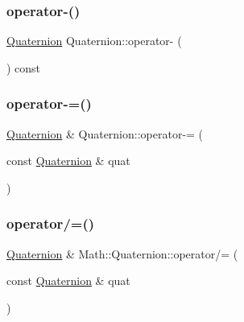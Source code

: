 \mbox{\label{struct_math_1_1_quaternion_aff7a0a5aeea4a3fe860cb90a649e389c}} 
\subsubsection{\texorpdfstring{operator-\/()}{operator-()}}
{\footnotesize\ttfamily \mbox{\hyperlink{struct_math_1_1_quaternion}{Quaternion}} Quaternion\+::operator-\/ (\begin{DoxyParamCaption}{ }\end{DoxyParamCaption}) const}

\mbox{\label{struct_math_1_1_quaternion_af1884a86f9d7d61197a2fb8a704bc58f}} 
\subsubsection{\texorpdfstring{operator-\/=()}{operator-=()}}
{\footnotesize\ttfamily \mbox{\hyperlink{struct_math_1_1_quaternion}{Quaternion}} \& Quaternion\+::operator-\/= (\begin{DoxyParamCaption}\item[{const \mbox{\hyperlink{struct_math_1_1_quaternion}{Quaternion}} \&}]{quat }\end{DoxyParamCaption})}

\mbox{\label{struct_math_1_1_quaternion_a04a144dcc8a5401104fd88248b13e84a}} 
\subsubsection{\texorpdfstring{operator/=()}{operator/=()}\hspace{0.1cm}{\footnotesize\ttfamily [1/2]}}
{\footnotesize\ttfamily \mbox{\hyperlink{struct_math_1_1_quaternion}{Quaternion}} \& Math\+::\+Quaternion\+::operator/= (\begin{DoxyParamCaption}\item[{const \mbox{\hyperlink{struct_math_1_1_quaternion}{Quaternion}} \&}]{quat }\end{DoxyParamCaption})}

